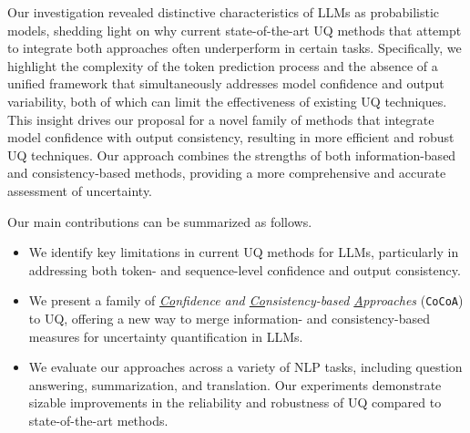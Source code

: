   Our investigation revealed distinctive characteristics of LLMs as probabilistic models, shedding light on why current state-of-the-art UQ methods that attempt to integrate both approaches often underperform in certain tasks. Specifically, we highlight the complexity of the token prediction process and the absence of a unified framework that simultaneously addresses model confidence and output variability, both of which can limit the effectiveness of existing UQ techniques. This insight drives our proposal for a novel family of methods that integrate model confidence with output consistency, resulting in more efficient and robust UQ techniques. Our approach combines the strengths of both information-based and consistency-based methods, providing a more comprehensive and accurate assessment of uncertainty.

  Our main contributions can be summarized as follows.
  \begin{itemize}
    \item We identify key limitations in current UQ methods for LLMs, particularly in addressing both token- and sequence-level confidence and output consistency.

    \item We present a family of \textit{\underline{Co}nfidence and \underline{Co}nsistency-based \underline{A}pproaches} (\texttt{CoCoA}) to UQ, offering a new way to merge information- and consistency-based measures for uncertainty quantification in LLMs.
        
    \item We evaluate our approaches across a variety of NLP tasks, including question answering, summarization, and translation. Our experiments demonstrate sizable improvements in the reliability and robustness of UQ compared to state-of-the-art methods.
  \end{itemize}
